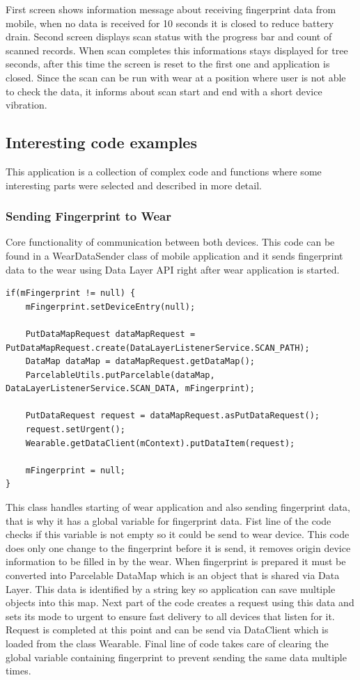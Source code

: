 First screen shows information message about receiving fingerprint data from mobile, when no data is received for 10 seconds it is closed to reduce battery drain. Second screen displays scan status with the progress bar and count of scanned records. When scan completes this informations stays displayed for tree seconds, after this time the screen is reset to the first one and application is closed. Since the scan can be run with wear at a position where user is not able to check the data, it informs about scan start and end with a short device vibration.

\subsection{Interesting code examples}\label{subsec:Interesting code examples}
This application is a collection of complex code and functions where some interesting parts were selected and described in more detail.

\subsubsection{Sending Fingerprint to Wear}\label{subsubsec:SendingFingerprintToWear}
Core functionality of communication between both devices. This code can be found in a WearDataSender class of mobile application and it sends fingerprint data to the wear using Data Layer API right after wear application is started.

\begin{lstlisting}[caption=Sending Fingerprint to Wear]
if(mFingerprint != null) {
	mFingerprint.setDeviceEntry(null);
	
	PutDataMapRequest dataMapRequest = PutDataMapRequest.create(DataLayerListenerService.SCAN_PATH);
	DataMap dataMap = dataMapRequest.getDataMap();
	ParcelableUtils.putParcelable(dataMap, DataLayerListenerService.SCAN_DATA, mFingerprint);
	
	PutDataRequest request = dataMapRequest.asPutDataRequest();
	request.setUrgent();
	Wearable.getDataClient(mContext).putDataItem(request);
	
	mFingerprint = null;
}
\end{lstlisting}

This class handles starting of wear application and also sending fingerprint data, that is why it has a global variable for fingerprint data. Fist line of the code checks if this variable is not empty so it could be send to wear device. This code does only one change to the fingerprint before it is send, it removes origin device information to be filled in by the wear. When fingerprint is prepared it must be converted into Parcelable DataMap which is an object that is shared via Data Layer. This data is identified by a string key so application can save multiple objects into this map. Next part of the code creates a request using this data and sets its mode to urgent to ensure fast delivery to all devices that listen for it. Request is completed at this point and can be send via DataClient which is loaded from the class Wearable. Final line of code takes care of clearing the global variable containing fingerprint to prevent sending the same data multiple times.

